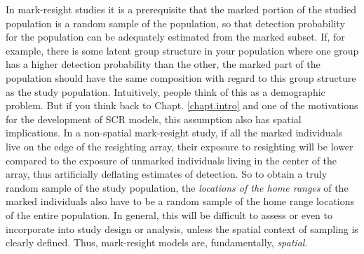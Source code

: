In mark-resight studies it is a prerequisite that the marked portion
of the studied population is a random sample of the population, so
that detection probability for the population can be adequately
estimated from the marked subset. If, for example, there is some
latent group structure in your population where one group has a higher
detection probability than the other, the marked part of the
population should have the same composition with regard to this group
structure as the study population. Intuitively, people think of this
as a demographic problem. But if you think back to
Chapt. \ref{chapt.intro} and one of the motivations for the
development of SCR models, this assumption also has spatial
implications. In a non-spatial mark-resight study, if all the
marked individuals live on the edge of the resighting array, their
exposure to resighting will be lower compared to the exposure of
unmarked individuals living in the center of the array,
thus artificially deflating estimates of detection. So to obtain a
truly random sample of the study population, the \emph{locations of
  the home ranges} of the marked individuals also have to be a random
sample of the home range locations of the entire population.  In
general, this will be difficult to assess or even to incorporate into
study design or analysis, unless the spatial context of sampling is
clearly defined.
Thus, mark-resight models are, fundamentally, {\it spatial}.


